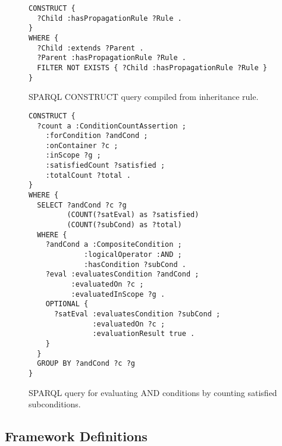 \documentclass{IOS-Book-Article}
\begin{document}
\begin{figure}[ht]
\begin{lstlisting}[basicstyle=\ttfamily, frame=none, language=SPARQL]
CONSTRUCT {
  ?Child :hasPropagationRule ?Rule .
}
WHERE {
  ?Child :extends ?Parent .
  ?Parent :hasPropagationRule ?Rule .
  FILTER NOT EXISTS { ?Child :hasPropagationRule ?Rule }
}
\end{lstlisting}
\caption{SPARQL CONSTRUCT query compiled from inheritance rule.}
\label{fig:appendix-sparql-construct}
\end{figure}

\begin{figure}[ht]
\begin{lstlisting}[basicstyle=\ttfamily, frame=none, language=SPARQL]
CONSTRUCT {
  ?count a :ConditionCountAssertion ;
    :forCondition ?andCond ;
    :onContainer ?c ;
    :inScope ?g ;
    :satisfiedCount ?satisfied ;
    :totalCount ?total .
}
WHERE {
  SELECT ?andCond ?c ?g 
         (COUNT(?satEval) as ?satisfied)
         (COUNT(?subCond) as ?total)
  WHERE {
    ?andCond a :CompositeCondition ;
             :logicalOperator :AND ;
             :hasCondition ?subCond .
    ?eval :evaluatesCondition ?andCond ;
          :evaluatedOn ?c ;
          :evaluatedInScope ?g .
    OPTIONAL { 
      ?satEval :evaluatesCondition ?subCond ;
               :evaluatedOn ?c ;
               :evaluationResult true .
    }
  }
  GROUP BY ?andCond ?c ?g
}
\end{lstlisting}
\caption{SPARQL query for evaluating AND conditions by counting satisfied subconditions.}
\label{fig:appendix-and-condition}
\end{figure}

\subsection{Framework Definitions}\label{sec:appendix-frameworks}
\end{document}
